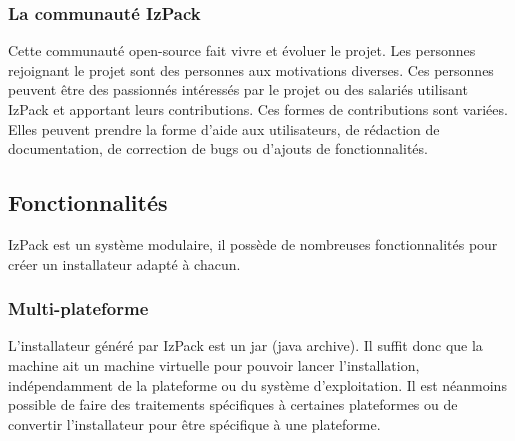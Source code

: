 \subsubsection{La communauté IzPack}
Cette communauté open-source fait vivre et évoluer le projet. Les personnes rejoignant le projet sont des personnes aux motivations diverses.
Ces personnes peuvent être des passionnés intéressés par le projet ou des salariés utilisant IzPack et apportant leurs contributions.
Ces formes de contributions sont variées.
Elles peuvent prendre la forme d'aide aux utilisateurs, de rédaction de documentation, de correction de bugs ou d'ajouts de fonctionnalités.
\subsection{Fonctionnalités}
IzPack est un système modulaire, il possède de nombreuses fonctionnalités pour créer un installateur adapté à chacun.
\subsubsection{Multi-plateforme}
L'installateur généré par IzPack est un jar (java archive).
Il suffit donc que la machine ait un machine virtuelle pour pouvoir lancer l'installation, indépendamment de la plateforme ou du système d'exploitation.
Il est néanmoins possible de faire des traitements spécifiques à certaines plateformes ou de convertir l'installateur pour être spécifique à une plateforme.
